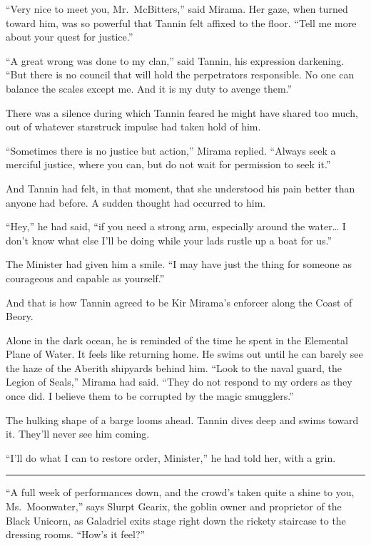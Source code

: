 \documentclass[smalldemyvopaper,11pt,twoside,onecolumn,openright,extrafontsizes]{memoir}
\begin{document}
``Very nice to meet you, Mr.~McBitters,'' said Mirama. Her gaze, when
turned toward him, was so powerful that Tannin felt affixed to the
floor. ``Tell me more about your quest for justice.''

``A great wrong was done to my clan,'' said Tannin, his expression
darkening. ``But there is no council that will hold the perpetrators
responsible. No one can balance the scales except me. And it is my duty
to avenge them.''

There was a silence during which Tannin feared he might have shared too
much, out of whatever starstruck impulse had taken hold of him.

``Sometimes there is no justice but action,'' Mirama replied. ``Always
seek a merciful justice, where you can, but do not wait for permission
to seek it.''

And Tannin had felt, in that moment, that she understood his pain better
than anyone had before. A sudden thought had occurred to him.

``Hey,'' he had said, ``if you need a strong arm, especially around the
water\ldots{} I don't know what else I'll be doing while your lads
rustle up a boat for us.''

The Minister had given him a smile. ``I may have just the thing for
someone as courageous and capable as yourself.''

And that is how Tannin agreed to be Kir Mirama's enforcer along the
Coast of Beory.

Alone in the dark ocean, he is reminded of the time he spent in the
Elemental Plane of Water. It feels like returning home. He swims out
until he can barely see the haze of the Aberith shipyards behind him.
``Look to the naval guard, the Legion of Seals,'' Mirama had said.
``They do not respond to my orders as they once did. I believe them to
be corrupted by the magic smugglers.''

The hulking shape of a barge looms ahead. Tannin dives deep and swims
toward it. They'll never see him coming.

``I'll do what I can to restore order, Minister,'' he had told her, with
a grin.

\begin{center}\rule{0.5\linewidth}{\linethickness}\end{center}

``A full week of performances down, and the crowd's taken quite a shine
to you, Ms.~Moonwater,'' says Slurpt Gearix, the goblin owner and
proprietor of the Black Unicorn, as Galadriel exits stage right down the
rickety staircase to the dressing rooms. ``How's it feel?''
\end{document}
